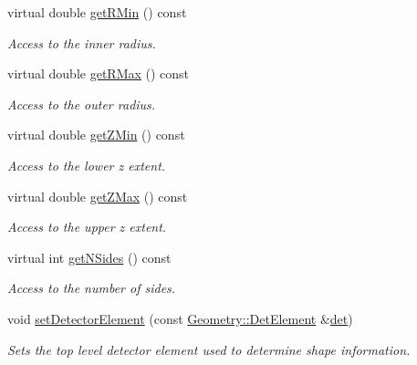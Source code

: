 \begin{DoxyCompactItemize}
virtual double \hyperlink{class_d_d4hep_1_1_d_d_rec_1_1_subdetector_extension_impl_ae7d7465cb600b068d0e2e9b2d80dd831}{get\+R\+Min} () const
\begin{DoxyCompactList}\small\item\em Access to the inner radius. \end{DoxyCompactList}\item 
virtual double \hyperlink{class_d_d4hep_1_1_d_d_rec_1_1_subdetector_extension_impl_a15bfbc17be22ce16a2f795c06c4ab571}{get\+R\+Max} () const
\begin{DoxyCompactList}\small\item\em Access to the outer radius. \end{DoxyCompactList}\item 
virtual double \hyperlink{class_d_d4hep_1_1_d_d_rec_1_1_subdetector_extension_impl_a49a166b8f3d0ae8f96f5440d792b9dff}{get\+Z\+Min} () const
\begin{DoxyCompactList}\small\item\em Access to the lower z extent. \end{DoxyCompactList}\item 
virtual double \hyperlink{class_d_d4hep_1_1_d_d_rec_1_1_subdetector_extension_impl_af83c23c0ccf18297c07bf3a55cc3b16c}{get\+Z\+Max} () const
\begin{DoxyCompactList}\small\item\em Access to the upper z extent. \end{DoxyCompactList}\item 
virtual int \hyperlink{class_d_d4hep_1_1_d_d_rec_1_1_subdetector_extension_impl_a1f9b794b782aef4c2da0d1399d4e001b}{get\+N\+Sides} () const
\begin{DoxyCompactList}\small\item\em Access to the number of sides. \end{DoxyCompactList}\item 
void \hyperlink{class_d_d4hep_1_1_d_d_rec_1_1_subdetector_extension_impl_a6b2e5282d0f58128a056e95459d61939}{set\+Detector\+Element} (const \hyperlink{class_d_d4hep_1_1_geometry_1_1_det_element}{Geometry\+::\+Det\+Element} \&\hyperlink{class_d_d4hep_1_1_d_d_rec_1_1_subdetector_extension_impl_a5573895361adac8070eb23454538d76e}{det})
\begin{DoxyCompactList}\small\item\em Sets the top level detector element used to determine shape information. \end{DoxyCompactList}\item 

\end{DoxyCompactItemize}
